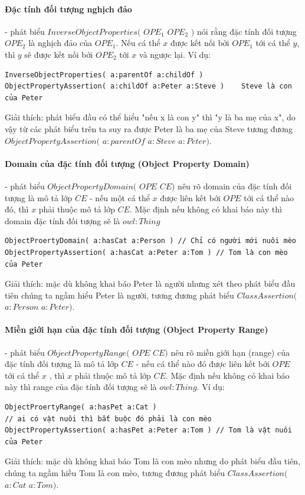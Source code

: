 \paragraph{Đặc tính đối tượng nghịch đảo} - phát biểu $InverseObjectProperties($ $OPE_{1}$ $OPE_{2}$ $)$ nói rằng đặc tính đối tượng $OPE_{2}$ là nghịch đảo của $OPE_{1}$. Nếu cá thể $x$ được kết nối bởi $OPE_{1}$ tới cá thể $y$, thì $y$ sẽ được kết nối bởi $OPE_{2}$ tới $x$ và ngược lại. Ví dụ:
\begin{verbatim}
InverseObjectProperties( a:parentOf a:childOf )
ObjectPropertyAssertion( a:childOf a:Peter a:Steve )	Steve là con của Peter
\end{verbatim}
Giải thích: phát biểu đầu có thể hiểu "nếu x là con y" thì "y là ba mẹ của x", do vậy từ các phát biểu trên ta suy ra được Peter là ba mẹ của Steve tương đương $ObjectPropertyAssertion($ $a:parentOf$ $a:Steve$ $a:Peter)$.

\paragraph{Domain của đặc tính đối tượng (Object Property Domain)} - phát biểu $ObjectPropertyDomain($ $OPE$ $CE)$ nêu rõ domain của đặc tính đối tượng là mô tả lớp $CE$ -  nếu một cá thể $x$ được liên kết bới $OPE$ tới cá thể nào đó, thì $x$ phải thuộc mô tả lớp $CE$. Mặc định nếu không có khai báo này thì domain đặc tính đối tượng sẽ là $owl:Thing$
\begin{verbatim}
ObjectProertyDomain( a:hasCat a:Person ) // Chỉ có người mới nuôi mèo
ObjectPropertyAssertion( a:hasCat a:Peter a:Tom ) // Tom là con mèo của Peter
\end{verbatim}
Giải thích: mặc dù không khai báo Peter là người nhưng xét theo phát biểu đầu tiên chúng ta ngầm hiểu Peter là người, tương đương phát biểu $ClassAssertion($ $a:Person$ $a:Peter)$.

\paragraph{Miền giới hạn của đặc tính đối tượng (Object Property Range)} - phát biểu $ObjectPropertyRange($ $OPE$ $CE)$ nêu rõ miền giới hạn (range) của đặc tính đối tượng là mô tả lớp $CE$ -  nếu cá thể nào đó được liên kết bới $OPE$ tới cá thể $x$ , thì $x$ phải thuộc mô tả lớp $CE$. Mặc định nếu không có khai báo này thì range của đặc tính đối tượng sẽ là $owl:Thing$. Ví dụ:
\begin{verbatim}
ObjectProertyRange( a:hasPet a:Cat ) 
// ai có vật nuôi thì bắt buộc đó phải là con mèo
ObjectPropertyAssertion( a:hasPet a:Peter a:Tom ) // Tom là vật nuôi của Peter
\end{verbatim}
Giải thích: mặc dù không khai báo Tom là con mèo nhưng do phát biểu đầu tiên, chúng ta ngầm hiều Tom là con mèo, tương đương phát biểu $ClassAssertion($ $a:Cat$ $a:Tom)$.









